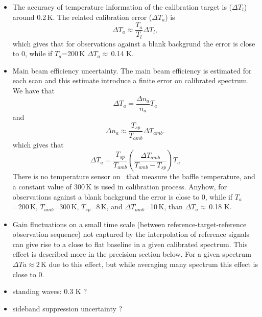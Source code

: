 \begin{itemize}

\item The accuracy of temperature information of the calibration target 
 is (\(\Delta T_{l}\)) around 0.2\,K. The related calibration error (\(\Delta T_{a}\)) is
 \begin{equation}
  \Delta T_{a} \approx \frac{T_{a}}{T_{l}} \Delta T_{l},  
 \end{equation}
 which gives that for observations against a blank backgrund the error
 is close to 0, while if \(T_{a}\)=200\,K \(\Delta T_{a}\)\(\approx\)\,0.14 K.  

\item Main beam efficiency uncertainty. The main beam efficiency is estimated
 for each scan and this estimate introduce a finite error on calibrated spectrum.
 We have that 
 \begin{equation}
  \Delta T_{a} = \frac{\Delta n_{a}}{n_{a}}T_{a}
 \end{equation}  
 and
 \begin{equation}
  \Delta n_{a} \approx \frac{T_{sp}}{T_{amb}}\Delta{T_{amb}}.
 \end{equation}
  which gives that
 \begin{equation}
  \Delta T_{a} = \frac{T_{sp}}{T_{amb}}\left(\frac{\Delta T_{amb}}{T_{amb}-T_{sp}}\right)T_{a}
 \end{equation}
 There is no temperature sensor on \smr\ that measure the baffle temperature, and a constant
 value of 300\,K is used in calibration process.
 Anyhow, for  observations against a blank backgrund the error
 is close to 0, while if \(T_{a}\)=200\,K, \(T_{amb}\)=300\,K, \(T_{sp}\)=8\,K, 
 and \(\Delta T_{amb}\)=10\,K, than \(\Delta T_{a}\)\(\approx\)\,0.18 K.

\item Gain fluctuations on a small time scale (between reference-target-reference
observation sequence) not captured by the interpolation of reference signals
can give rise to a close to flat baseline in a given calibrated spectrum.
This effect is described more in the precision section below.
For a given spectrum \(\Delta Ta\)\(\approx\)2\,K due to this effect,
but while averaging many spectrum this effect is close to 0. 

\item standing waves: 0.3 K ?

\item sideband suppression uncertainty ? 

\end{itemize}

